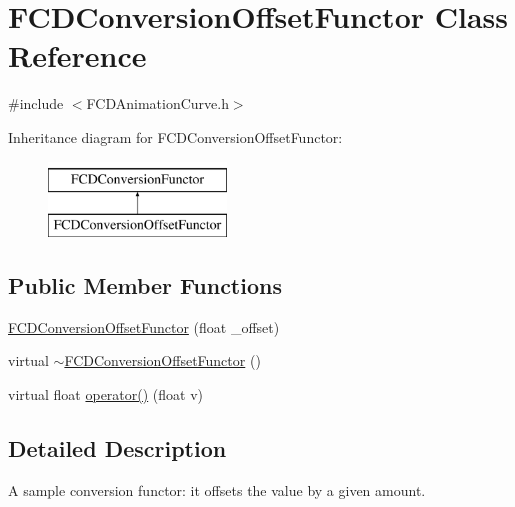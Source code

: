 \hypertarget{classFCDConversionOffsetFunctor}{
\section{FCDConversionOffsetFunctor Class Reference}
\label{classFCDConversionOffsetFunctor}
}


{\ttfamily \#include $<$FCDAnimationCurve.h$>$}

Inheritance diagram for FCDConversionOffsetFunctor:\begin{figure}[H]
\begin{center}
\leavevmode
\includegraphics[height=2.000000cm]{classFCDConversionOffsetFunctor}
\end{center}
\end{figure}
\subsection*{Public Member Functions}
\begin{DoxyCompactItemize}
\item 
\hyperlink{classFCDConversionOffsetFunctor_aa26f96382ae8854e902e6dab056141d8}{FCDConversionOffsetFunctor} (float \_\-offset)
\item 
virtual \hyperlink{classFCDConversionOffsetFunctor_ac24d34325f5ece40a70063258585108e}{$\sim$FCDConversionOffsetFunctor} ()
\item 
virtual float \hyperlink{classFCDConversionOffsetFunctor_ad9fa76a47de5e11521394e7eff97e2f7}{operator()} (float v)
\end{DoxyCompactItemize}


\subsection{Detailed Description}
A sample conversion functor: it offsets the value by a given amount. 


